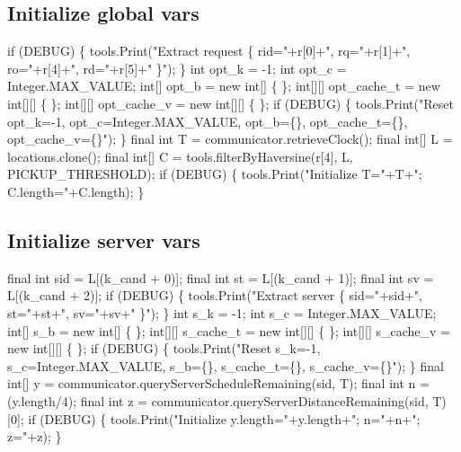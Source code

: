 \subsection{Initialize global vars}
\nwenddocs{}\endmoddef\nwstartdeflinemarkup{}\nwenddeflinemarkup
if (DEBUG) \{
  tools.Print("Extract request \{ rid="+r[0]+", rq="+r[1]+", ro="+r[4]+", rd="+r[5]+" \}");
\}
int     opt_k       = -1;
int     opt_c       = Integer.MAX_VALUE;
int[]   opt_b       = new int[] \{ \};
int[][] opt_cache_t = new int[][] \{ \};
int[][] opt_cache_v = new int[][] \{ \};
if (DEBUG) \{
  tools.Print("Reset opt_k=-1, opt_c=Integer.MAX_VALUE, opt_b=\{\}, opt_cache_t=\{\}, opt_cache_v=\{\}");
\}
final int   T = communicator.retrieveClock();
final int[] L = locations.clone();
final int[] C = tools.filterByHaversine(r[4], L, PICKUP_THRESHOLD);
if (DEBUG) \{
  tools.Print("Initialize T="+T+"; C.length="+C.length);
\}
\nwendcode{}\nwdocspar

\subsection{Initialize server vars}
\nwenddocs{}\endmoddef\nwstartdeflinemarkup{}\nwenddeflinemarkup
final int sid = L[(k_cand + 0)];
final int st  = L[(k_cand + 1)];
final int sv  = L[(k_cand + 2)];
if (DEBUG) \{
  tools.Print("Extract server \{ sid="+sid+", st="+st+", sv="+sv+" \}");
\}
int     s_k       = -1;
int     s_c       = Integer.MAX_VALUE;
int[]   s_b       = new int[] \{ \};
int[][] s_cache_t = new int[][] \{ \};
int[][] s_cache_v = new int[][] \{ \};
if (DEBUG) \{
  tools.Print("Reset s_k=-1, s_c=Integer.MAX_VALUE, s_b=\{\}, s_cache_t=\{\}, s_cache_v=\{\}");
\}
final int[] y = communicator.queryServerScheduleRemaining(sid, T);
final int   n = (y.length/4);
final int   z = communicator.queryServerDistanceRemaining(sid, T)[0];
if (DEBUG) \{
  tools.Print("Initialize y.length="+y.length+"; n="+n+"; z="+z);
\}
\nwendcode{}\nwdocspar


